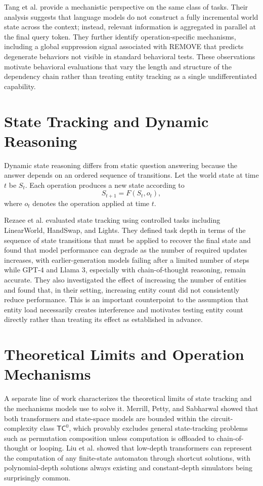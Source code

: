 \documentclass{iutbscthesis}
\begin{document}
Tang et al. \cite{tang2026track} provide a mechanistic perspective on the same class of tasks.
Their analysis suggests that language models do not construct a fully incremental world state across
the context; instead, relevant information is aggregated in parallel at the final query token. They
further identify operation-specific mechanisms, including a global suppression signal associated with
REMOVE that predicts degenerate behaviors not visible in standard behavioral tests. These
observations motivate behavioral evaluations that vary the length and structure of the dependency
chain rather than treating entity tracking as a single undifferentiated capability.

\section{State Tracking and Dynamic Reasoning}
Dynamic state reasoning differs from static question answering because the answer depends on an
ordered sequence of transitions. Let the world state at time $t$ be $S_t$. Each operation produces
a new state according to
\[
S_{t+1}=F(S_t,o_t),
\]
where $o_t$ denotes the operation applied at time $t$.

Rezaee et al. \cite{rezaee2025exploring} evaluated state tracking using controlled tasks including
LinearWorld, HandSwap, and Lights. They defined task depth in terms of the sequence of state
transitions that must be applied to recover the final state and found that model performance can
degrade as the number of required updates increases, with earlier-generation models failing after a
limited number of steps while GPT-4 and Llama 3, especially with chain-of-thought reasoning, remain
accurate. They also investigated the effect of increasing the number of entities and found that, in
their setting, increasing entity count did not consistently reduce performance. This is an important
counterpoint to the assumption that entity load necessarily creates interference and motivates
testing entity count directly rather than treating its effect as established in advance.

\section{Theoretical Limits and Operation Mechanisms}
A separate line of work characterizes the theoretical limits of state tracking and the mechanisms
models use to solve it. Merrill, Petty, and Sabharwal \cite{merrill2024illusion} showed that both
transformers and state-space models are bounded within the circuit-complexity class $\mathsf{TC}^0$,
which provably excludes general state-tracking problems such as permutation composition unless
computation is offloaded to chain-of-thought or looping. Liu et al. \cite{liu2023shortcuts} showed
that low-depth transformers can represent the computation of any finite-state automaton through
shortcut solutions, with polynomial-depth solutions always existing and constant-depth simulators
being surprisingly common.
\end{document}
